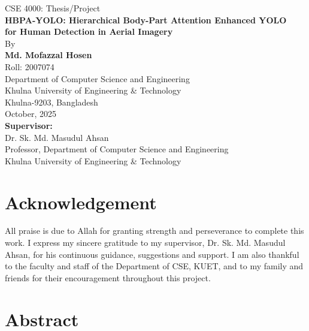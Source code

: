 \documentclass[12pt,a4paper]{report}
\begin{document}
\begin{titlepage}
\centering
{\Large CSE 4000: Thesis/Project}\\[2ex]
{\LARGE \textbf{HBPA-YOLO: Hierarchical Body-Part Attention Enhanced YOLO}}\\[1ex]
{\LARGE \textbf{for Human Detection in Aerial Imagery}}\\[4ex]

{\large By}\\[1ex]
{\large \textbf{Md. Mofazzal Hosen}}\\
{\large Roll: 2007074}\\[3ex]

{\large Department of Computer Science and Engineering}\\
{\large Khulna University of Engineering \& Technology}\\
{\large Khulna-9203, Bangladesh}\\[3ex]

{\large October, 2025}\\[3ex]

{\large \textbf{Supervisor:}}\\[1ex]
{\large Dr. Sk. Md. Masudul Ahsan}\\
{\large Professor, Department of Computer Science and Engineering}\\
{\large Khulna University of Engineering \& Technology}\\[5ex]

\end{titlepage}

\chapter*{Acknowledgement}

All praise is due to Allah for granting strength and perseverance to complete this work. I express my sincere gratitude to my supervisor, Dr. Sk. Md. Masudul Ahsan, for his continuous guidance, suggestions and support. I am also thankful to the faculty and staff of the Department of CSE, KUET, and to my family and friends for their encouragement throughout this project.


\chapter*{Abstract}
\end{document}
